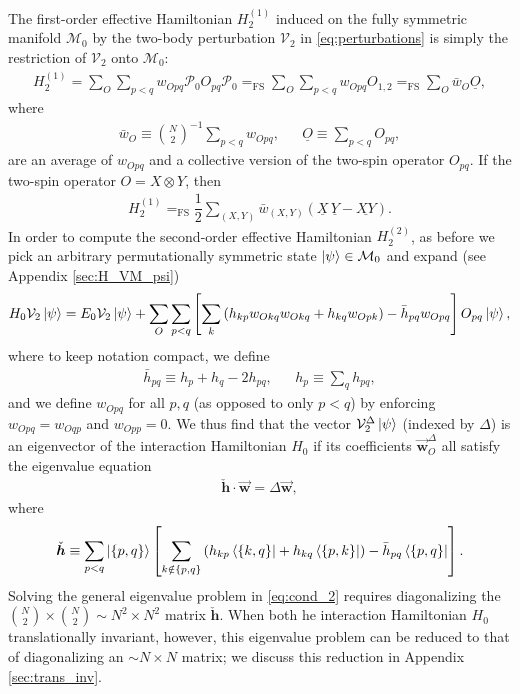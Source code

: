 \documentclass[nofootinbib,notitlepage,11pt]{revtex4-2}
\newcommand{\f}[2]{\dfrac{#1}{#2}} %
\newcommand{\p}[1]{\left(#1\right)} %
\renewcommand{\sp}[1]{\left[#1\right]} %
\renewcommand{\set}[1]{\left\{#1\right\}} %
\renewcommand{\c}{\cdot} %
\newcommand{\m}{\bm} %
\renewcommand{\v}{\vec} %
\newcommand{\1}{\mathds{1}}
\newcommand{\M}{\mathcal{M}}
\renewcommand{\P}{\mathcal{P}}
\newcommand{\V}{\mathcal{V}}
\newcommand{\EQFS}{=_{\text{FS}}}
\newcommand{\col}{\underline}
\begin{document}
The first-order effective Hamiltonian $H_2^{(1)}$ induced on the fully
symmetric manifold $\M_0$ by the two-body perturbation $\V_2$ in
\eqref{eq:perturbations} is simply the restriction of $\V_2$ onto
$\M_0$:
\begin{align}
  H_2^{(1)} = \sum_O \sum_{p<q} w_{Opq} \P_0 O_{pq} \P_0
  \EQFS \sum_O \sum_{p<q} w_{Opq} O_{1,2}
  \EQFS \sum_O \bar w_O \col{O},
\end{align}
where
\begin{align}
  \bar w_O \equiv {N \choose 2}^{-1} \sum_{p<q} w_{Opq},
  &&
  \col{O} \equiv \sum_{p<q} O_{pq},
\end{align}
are an average of $w_{Opq}$ and a collective version of the two-spin
operator $O_{pq}$.  If the two-spin operator $O=X\otimes Y$, then
\begin{align}
  H_2^{(1)} \EQFS \f12 \sum_{\p{X,Y}} \bar w_{\p{X,Y}}
  \p{\col{X}\,\col{Y} - \col{XY}}.
\end{align}
In order to compute the second-order effective Hamiltonian
$H_2^{(2)}$, as before we pick an arbitrary permutationally symmetric
state $\ket\psi\in\M_0$ and expand (see Appendix \ref{sec:H_VM_psi})
\begin{align}
  H_0 \V_2 \ket\psi
  = E_0 \V_2 \ket\psi
  + \sum_O \sum_{p<q}
  \sp{\sum_k \p{h_{kp} w_{Okq} w_{Okq} + h_{kq} w_{Opk}}
  - \bar h_{pq} w_{Opq}}
  O_{pq} \ket\psi,
  \label{eq:H_V2_psi}
\end{align}
where to keep notation compact, we define
\begin{align}
  \bar h_{pq} \equiv h_p + h_q - 2 h_{pq},
  &&
  h_p \equiv \sum_q h_{pq},
\end{align}
and we define $w_{Opq}$ for all $p,q$ (as opposed to only $p<q$) by
enforcing $w_{Opq}=w_{Oqp}$ and $w_{Opp}=0$.  We thus find that the
vector $\V_2^\Delta\ket\psi$ (indexed by $\Delta$) is an eigenvector
of the interaction Hamiltonian $H_0$ if its coefficients
$\v{\m w}_O^\Delta$ all satisfy the eigenvalue equation
\begin{align}
  \check{\m h} \c \v{\m w} = \Delta \v{\m w},
  \label{eq:cond_2}
\end{align}
where
\begin{align}
  \check{\m h}
  \equiv \sum_{p<q} \ket{\set{p,q}} \sp{\sum_{k\notin\set{p,q}}
    \p{h_{kp} \bra{\set{k,q}} + h_{kq} \bra{\set{p,k}}}
    - \bar h_{pq} \bra{\set{p,q}}}.
  \label{eq:h_super_mat}
\end{align}
Solving the general eigenvalue problem in \eqref{eq:cond_2} requires
diagonalizing the ${N \choose 2}\times{N \choose 2}\sim N^2\times N^2$
matrix $\check{\m h}$.  When both he interaction Hamiltonian $H_0$
translationally invariant, however, this eigenvalue problem can be
reduced to that of diagonalizing an $\sim N\times N$ matrix; we
discuss this reduction in Appendix \ref{sec:trans_inv}.
\end{document}
